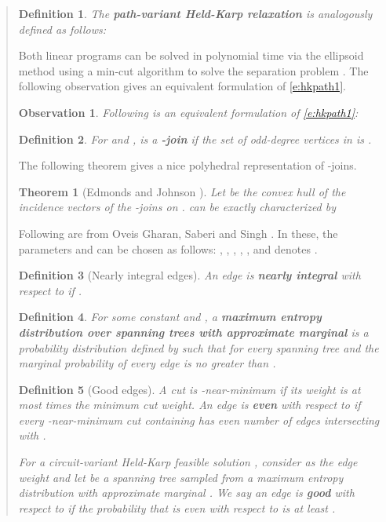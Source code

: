 \documentclass[11pt,letterpaper]{article}
\newtheorem{thm}{Theorem}
\newtheorem{defn}{Definition}
\newtheorem{obs}{Observation}
\begin{document}
\begin{quote}
\begin{defn}
\label{d:hkpath}
The \textbf{path-variant Held-Karp relaxation} is analogously defined as follows:
\end{defn}

Both linear programs can be solved in polynomial time via the ellipsoid method using a min-cut algorithm to solve the separation problem \cite{GLS}. The following observation gives an equivalent formulation of \eqref{e:hkpath1}.

\begin{obs}
\label{o:hkequiv}
Following is an equivalent formulation of \eqref{e:hkpath1}:
\end{obs}

\begin{defn}
For  and ,  is a \textbf{-join} if the set of odd-degree vertices in  is .
\end{defn}

The following theorem gives a nice polyhedral representation of -joins.

\begin{thm}[Edmonds and Johnson \cite{EJ}]
\label{t:tjoinpr}
Let  be the convex hull of the incidence vectors of the -joins on .  can be exactly characterized by

\end{thm}

Following are from Oveis Gharan, Saberi and Singh \cite{OSS}. In these, the parameters  and  can be chosen as follows: , , , , , and  denotes .

\begin{defn}[Nearly integral edges]\label{d:niedges}
An edge  is \textbf{nearly integral} with respect to  if .
\end{defn}

\begin{defn}\label{d:approxm}
For some constant  and , a \textbf{maximum entropy distribution over spanning trees with approximate marginal}  is a probability distribution  defined by  such that  for every spanning tree  and the marginal probability of every edge  is no greater than .
\end{defn}

\begin{defn}[Good edges]\label{d:goodedges}
A cut is -near-minimum if its weight is at most  times the minimum cut weight. An edge  is \textbf{even} with respect to  if every -near-minimum cut containing  has even number of edges intersecting with .

For a circuit-variant Held-Karp feasible solution , consider  as the edge weight and let  be a spanning tree sampled from a maximum entropy distribution with approximate marginal . We say an edge  is \textbf{good} with respect to  if the probability that  is even with respect to  is at least .
\end{defn}


\end{quote}
\end{document}

